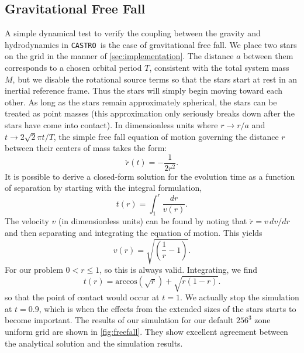 \documentclass[iop,numberedappendix]{../emulateapj}
\newcommand{\castro}{\texttt{CASTRO}}
\begin{document}
\subsection{Gravitational Free Fall}\label{sec:Gravitational Free Fall}

A simple dynamical test to verify the coupling between the gravity and hydrodynamics in \castro\ is
the case of gravitational free fall. We place two stars on the grid 
in the manner of \autoref{sec:implementation}. The distance $a$ between 
them corresponds to a chosen orbital period $T$, consistent with the total
system mass $M$, but we disable the rotational source terms so that 
the stars start at rest in an inertial reference frame. 
Thus the stars will simply begin moving toward each other.
As long as the stars remain approximately spherical, the stars can be 
treated as point masses (this approximation only seriously breaks down after the stars
have come into contact). In dimensionless units where $r \to r / a$ and 
$t \to 2\sqrt{2}\pi t / T$, the simple free fall equation of motion governing the
distance $r$ between their centers of mass takes the form:
\begin{equation}
  \ddot{r}(t) = - \frac{1}{2r^2}.
\end{equation}
It is possible to derive a closed-form solution for the evolution time
as a function of separation by starting with the integral formulation,
\begin{equation}
  t(r) = \int_{1}^{r} \frac{dr}{v(r)}.
\end{equation}
The velocity $v$ (in dimensionless units) can be found by noting that 
$\ddot{r} = v\, dv / dr$ and then separating and integrating the equation 
of motion. This yields 
\begin{equation}
  v(r) = \sqrt{\left(\frac{1}{r} - 1\right)}.
\end{equation}
For our problem $0 < r \leq 1$, so this is always valid. Integrating, we find
\begin{equation}
  t(r) = \text{arccos}\left(\sqrt{r}\right) + \sqrt{r \left(1 - r\right)}. \label{analyticalFreeFall}
\end{equation}
so that the point of contact would occur at $t = 1$. We actually stop the simulation
at $t = 0.9$, which is when the effects from the extended sizes of the stars
starts to become important. The results of our simulation for our default $256^3$ zone 
uniform grid are shown in \autoref{fig:freefall}. They show excellent agreement
between the analytical solution and the simulation results.
\end{document}
